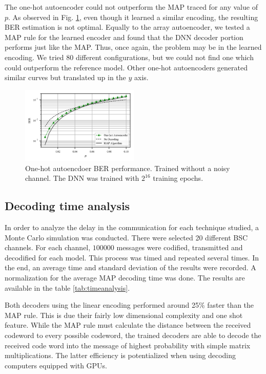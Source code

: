 \documentclass[conference]{IEEEtran}
\begin{document}
The one-hot autoencoder could not outperform the MAP traced for any value of $p$. As observed in Fig. \ref{fig:1Hautoencoder}, even though it learned a similar encoding, the resulting BER estimation is not optimal. Equally to the array autoencoder, we tested a MAP rule for the learned encoder and found that the DNN decoder portion performs just like the MAP. Thus, once again, the problem may be in the learned encoding. We tried 80 different configurations, but we could not find one which could outperform the reference model. Other one-hot autoencoders generated similar curves but translated up in the $y$ axis.


\begin{figure}[!ht]
  \centering
    \includegraphics[width=0.5\textwidth]{images/MAP_Autoencoder1H_Mep_131072_ptrain_0_192_128_96_64_32-128}
    \caption{One-hot autoencdoer BER performance. Trained without a noisy channel. The DNN was trained with $2^{16}$ training epochs.}\label{fig:1Hautoencoder}
\end{figure}

\subsection{Decoding time analysis}

In order to analyze the delay in the communication for each technique studied, a Monte Carlo simulation was conducted. There were selected 20 different BSC channels. For each channel, $100000$ messages were codified, transmitted and decodified for each model. This process was timed and repeated several times. In the end, an average time and standard deviation of the results were recorded. A normalization for the average MAP decoding time was done. The results are available in the table \ref{tab:timeanalysis}.  

Both decoders using the linear encoding performed around 25\% faster than the MAP rule. This is due their fairly low dimensional complexity and one shot feature. While the MAP rule must calculate the distance between the received codeword to every possible codeword, the trained decoders are able to decode the received code word into the message of highest probability with simple matrix multiplications. The latter efficiency is potentialized when using decoding computers equipped with GPUs.
\end{document}
